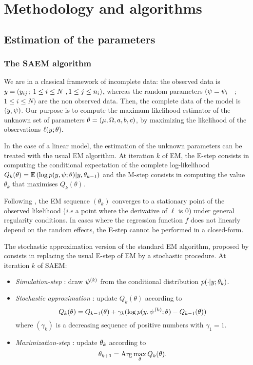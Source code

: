 
\chapter{Methodology and algorithms}  \label{chapter_methodology}
\section{Estimation of the parameters}
\subsection{The SAEM algorithm}\label{saem}

We are in a classical framework of incomplete data: the observed data is $y=(y_{ij} \, ; \, 1  \leq i \leq N \ , 1 \leq j \leq n_i)$, whereas the random parameters $(\psi={\psi_i}$ \, ; \, $1 \leq i \leq N)$ are the non observed data. Then, the complete data of the model is $(y,\psi)$. Our purpose is to compute the maximum likelihood estimator of the unknown set of parameters $\thetag=(\fixed_effect,\IIV,\ag,\bg,\cg)$, by maximizing the likelihood of the observations $\ell(y ;\theta)$.

In the case of a linear model, the estimation of the unknown parameters can be treated with the usual EM algorithm. At iteration $k$ of EM, the E-step consists in computing the conditional expectation of the complete log-likelihood $Q_k(\theta)= \mathbb{E}\left(\log p(y,\psi;\theta) | y,\theta_{k-1} \right)$ and the M-step consists in computing the value $\theta_{k}$ that maximises $Q_k(\theta)$.

Following \cite{Dempster77,Wu83}, the EM sequence $(\theta_k)$ converges to a stationary point of the observed likelihood ({\it i.e} a point where the derivative of $\ell$ is 0) under general regularity conditions. In cases  where the regression function $f$ does not linearly depend on the random  effects, the E-step cannot be performed in a closed-form.

The stochastic approximation version  of the  standard EM  algorithm, proposed by \cite{Delyon} consists in replacing the usual E-step of EM by a stochastic procedure. At iteration $k$ of SAEM:
\begin{itemize}
\item {\em Simulation-step} : draw $\psi^{(k)}$ from the conditional distribution  $p(\cdot|y;{\theta_k})$.
\item {\em Stochastic approximation} : update $Q_k(\theta)$ according to
\begin{equation}
 Q_k(\theta) = Q_{k-1}(\theta) + \gamma_k ( \log p(y,\psi^{(k)};\theta) - Q_{k-1}(\theta) )
\end{equation}
where $(\gamma_k)$ is a decreasing sequence of positive numbers with $\gamma_1=1$. 
\item {\em Maximization-step} : update ${\theta_k}$ according to 
$${\theta_{k+1}}={\rm Arg}\max_{{\theta}} Q_k(\theta).$$
\end{itemize}


